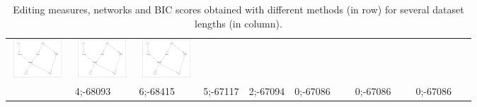 \begin{table}[!p]
\begin{tabular}{r@{}p{2.0cm}@{}p{2.0cm}@{}p{2.0cm}@{}p{2.0cm}@{}p{2.0cm}@{}p{2.0cm}@{}p{2.0cm}}
\colorbox{Ocase}{\includegraphics[width=20.3mm, height=14.25mm]{fig/28-Jul-2003-17-49-38-dag-asia5000-GES-RES}} &
\colorbox{Ocase}{\includegraphics[width=20.3mm, height=14.25mm]{fig/28-Jul-2003-17-49-38-dag-asia10000-GES-RES}} &
\colorbox{Ocase}{\includegraphics[width=20.3mm, height=14.25mm]{fig/28-Jul-2003-17-49-38-dag-asia15000-GES-RES}} \\
& 4;-68093 & 6;-68415 & 5;-67117 & 2;-67094 & \colorbox{Ocase}{0;-67086~~~} & \colorbox{Ocase}{0;-67086~~~} & \colorbox{Ocase}{0;-67086~~~} \\
\end{tabular}
\caption{Editing measures, networks and BIC scores obtained with different methods (in row) for several dataset lengths (in column).}
\label{asia}
\end{table}


